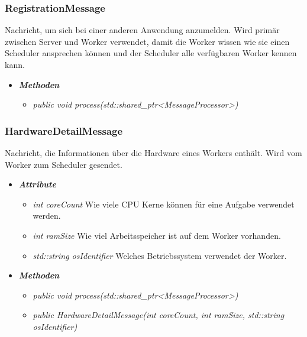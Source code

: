 \documentclass[a4paper,12pt]{article}
\begin{document}
\subsubsection{RegistrationMessage}

Nachricht, um sich bei einer anderen Anwendung anzumelden. Wird primär zwischen Server und Worker verwendet, damit die Worker wissen wie sie einen Scheduler ansprechen können und der Scheduler alle verfügbaren Worker kennen kann.

	\begin{itemize}[label={}]

	\item\textit{\textbf{Methoden}}
		\begin{itemize}[label={\textbullet}]
			\item\textit{public void process(std::shared\_ptr<MessageProcessor>)}

		\end{itemize}

\end{itemize}


\subsubsection{HardwareDetailMessage}

Nachricht, die Informationen über die Hardware eines Workers enthält. Wird vom Worker zum Scheduler gesendet.

	\begin{itemize}[label={}]

	\item\textit{\textbf{Attribute}}
		\begin{itemize}[label={\textbullet}]
			\item\textit{int coreCount} Wie viele CPU Kerne können für eine Aufgabe verwendet werden.
			\item\textit{int ramSize} Wie viel Arbeitsspeicher ist auf dem Worker vorhanden.
			\item\textit{std::string osIdentifier} Welches Betriebssystem verwendet der Worker.
			
		\end{itemize}

	\item\textit{\textbf{Methoden}}
		\begin{itemize}[label={\textbullet}]
			\item\textit{public void process(std::shared\_ptr<MessageProcessor>)}
			\item\textit{public HardwareDetailMessage(int coreCount, int ramSize, std::string osIdentifier)}

		\end{itemize}

\end{itemize}
\end{document}
